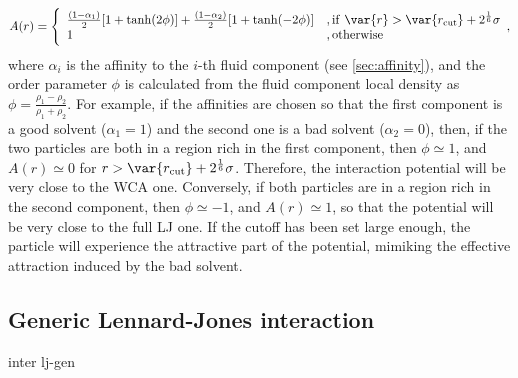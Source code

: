 \begin{equation}
  \label{eq:lj-affinity}
  A(r) = \Biggl\{
    \begin{array}{ll}
      \frac{(1-\alpha_1)}{2} [1+\tanh(2\phi)]  +  \frac{(1-\alpha_2)}{2} [1+\tanh(-2\phi)]
      & \mathrm{, if~}  \var{r} > \var{r_\mathrm{cut}}+2^{\frac{1}{6}}\sigma\\
      1
      & \mathrm{, otherwise~} \\
    \end{array},
\end{equation}
where $\alpha_i$ is the affinity to the $i$-th fluid component (see
\ref{sec:affinity}), and the order parameter $\phi$ is calculated
from the fluid component local density as $\phi=\frac{\rho_1 -
\rho_2}{\rho_1+\rho_2}$. For example, if the affinities are chosen
so that the first component is a good solvent ($\alpha_1=1$) and
the second one is a bad solvent ($\alpha_2=0$), then, if the two
particles are both in a region rich in the first component, then
$\phi\simeq1$, and $A(r)\simeq0$ for
$r>\var{r_\mathrm{cut}}+2^{\frac{1}{6}}\sigma$.  Therefore, the
interaction potential will be very close to the WCA one. Conversely,
if both particles are in a region rich in the second component,
then $\phi\simeq-1$, and  $A(r)\simeq 1$, so that the potential
will be very close to the full LJ one. If the cutoff has been set
large enough, the particle will experience the attractive part of
the potential, mimiking the effective attraction induced by the bad
solvent.



\subsection{Generic Lennard-Jones interaction}
\label{sec:GenLennardJones}

\begin{essyntax}
  inter  
  lj-gen
  \var{\epsilon} \var{\sigma} 
    
     
  \begin{features}
  \end{features}
\end{essyntax}

